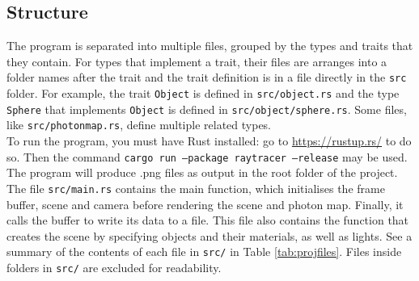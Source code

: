 \documentclass[a4paper]{article}
\begin{document}
\subsection{Structure}
The program is separated into multiple files, grouped by the types and traits that they contain. For types that implement a trait, their files are arranges into a folder names after the trait and the trait definition is in a file directly in the \texttt{src} folder. For example, the trait \texttt{Object} is defined in \texttt{src/object.rs} and the type \texttt{Sphere} that implements \texttt{Object} is defined in \texttt{src/object/sphere.rs}. Some files, like \texttt{src/photonmap.rs}, define multiple related types.\\

To run the program, you must have Rust installed: go to \url{https://rustup.rs/} to do so. Then the command \texttt{cargo run --package raytracer --release} may be used. The program will produce .png files as output in the root folder of the project.\\

The file \texttt{src/main.rs} contains the main function, which initialises the frame buffer, scene and camera before rendering the scene and photon map. Finally, it calls the buffer to write its data to a file. This file also contains the function that creates the scene by specifying objects and their materials, as well as lights. See a summary of the contents of each file in \texttt{src/} in Table \ref{tab:projfiles}. Files inside folders in \texttt{src/} are excluded for readability.\\
\end{document}
